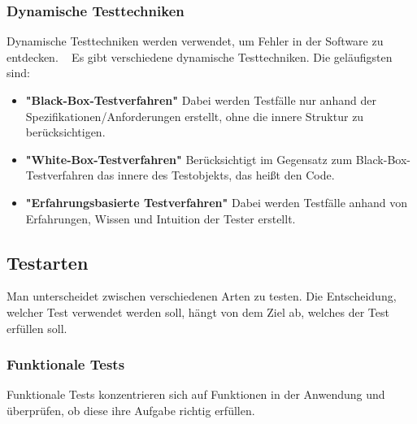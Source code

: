 \subsubsection{Dynamische Testtechniken}
Dynamische Testtechniken werden verwendet, um Fehler in der Software zu entdecken.
\newline
~\cite{software_testing_methoden}
Es gibt verschiedene dynamische Testtechniken. Die geläufigsten sind:
\begin{itemize}
  \item \textbf{"Black-Box-Testverfahren"}
  Dabei werden Testfälle nur anhand der Spezifikationen/Anforderungen erstellt, 
  ohne die innere Struktur zu berücksichtigen.
  ~\cite{black_box}
  \item \textbf{"White-Box-Testverfahren"}
  Berücksichtigt im Gegensatz zum Black-Box-Testverfahren das innere des Testobjekts,
  das heißt den Code.
  ~\cite{white_box}
  \item \textbf{"Erfahrungsbasierte Testverfahren"}
  Dabei werden Testfälle anhand von Erfahrungen, Wissen und Intuition der Tester erstellt.
  ~\cite{erfahrungsbasiertes_testen}
\end{itemize}

\subsection{Testarten}
Man unterscheidet zwischen verschiedenen Arten zu testen. Die Entscheidung, welcher Test verwendet werden
soll, hängt von dem Ziel ab, welches der Test erfüllen soll.
\subsubsection{Funktionale Tests}
Funktionale Tests konzentrieren sich auf Funktionen in der Anwendung und überprüfen, 
ob diese ihre Aufgabe richtig erfüllen.

